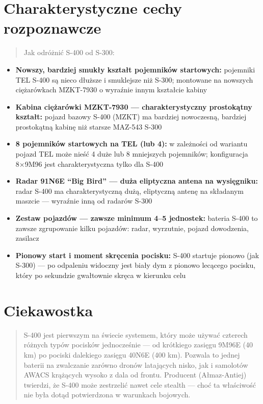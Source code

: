 \documentclass[12pt,openany,oneside]{book}
\providecommand{\tightlist}{%
  \setlength{\itemsep}{0pt}\setlength{\parskip}{0pt}}
\begin{document}
\section{Charakterystyczne cechy
rozpoznawcze}\label{charakterystyczne-cechy-rozpoznawcze-28}

\begin{quote}
Jak odróżnić S-400 od S-300:
\end{quote}

\begin{itemize}
\tightlist
\item
  \textbf{Nowszy, bardziej smukły kształt pojemników startowych:}
  pojemniki TEL S-400 są nieco dłuższe i smuklejsze niż S-300; montowane
  na nowszych ciężarówkach MZKT-7930 o wyraźnie innym kształcie kabiny
\item
  \textbf{Kabina ciężarówki MZKT-7930 --- charakterystyczny prostokątny
  kształt:} pojazd bazowy S-400 (MZKT) ma bardziej nowoczesną, bardziej
  prostokątną kabinę niż starsze MAZ-543 S-300
\item
  \textbf{8 pojemników startowych na TEL (lub 4):} w zależności od
  wariantu pojazd TEL może nieść 4 duże lub 8 mniejszych pojemników;
  konfiguracja 8×9M96 jest charakterystyczna tylko dla S-400
\item
  \textbf{Radar 91N6E ``Big Bird'' --- duża eliptyczna antena na
  wysięgniku:} radar S-400 ma charakterystyczną dużą, eliptyczną antenę
  na składanym maszcie --- wyraźnie inną od radarów S-300
\item
  \textbf{Zestaw pojazdów --- zawsze minimum 4--5 jednostek:} bateria
  S-400 to zawsze zgrupowanie kilku pojazdów: radar, wyrzutnie, pojazd
  dowodzenia, zasilacz
\item
  \textbf{Pionowy start i moment skręcenia pocisku:} S-400 startuje
  pionowo (jak S-300) --- po odpaleniu widoczny jest biały dym z pionowo
  lecącego pocisku, który po sekundzie gwałtownie skręca w kierunku celu
\end{itemize}

\section{Ciekawostka}\label{ciekawostka-28}

\begin{quote}
S-400 jest pierwszym na świecie systemem, który może używać czterech
różnych typów pocisków jednocześnie --- od krótkiego zasięgu 9M96E (40
km) po pociski dalekiego zasięgu 40N6E (400 km). Pozwala to jednej
baterii na zwalczanie zarówno dronów latających nisko, jak i samolotów
AWACS krążących wysoko z dala od frontu. Producent (Ałmaz-Antiej)
twierdzi, że S-400 może zestrzelić nawet cele stealth --- choć ta
właściwość nie była dotąd potwierdzona w warunkach bojowych.
\end{quote}
\end{document}
